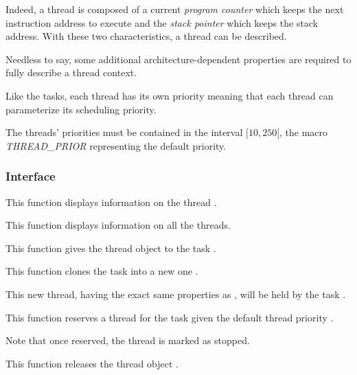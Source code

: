 Indeed, a thread is composed of a current \textit{program counter} which
keeps the next instruction address to execute and the \textit{stack pointer}
which keeps the stack address. With these two characteristics, a thread
can be described.

Needless to say, some additional architecture-dependent properties are
required to fully describe a thread context.

Like the tasks, each thread has its own priority meaning that each thread
can parameterize its scheduling priority.

The threads' priorities must be contained in the interval $[10, 250[$, the
macro \textit{THREAD\_PRIOR} representing the default priority.

%
%

\subsubsection{Interface}

	 {
	   This function displays information on the thread .
	 }

	 {
	   This function displays information on all the threads.
	 }

	 {
	   This function gives the thread object  to the
	   task .
	 }

	 {
	   This function clones the task  into a new one
	   .

	   This new thread, having the exact same properties as ,
	   will be held by the task .
	 }

	 {
	   This function reserves a thread for the task 
	   given the default thread priority .

	   Note that once reserved, the thread is marked as stopped.
	 }

	 {
	   This function releases the thread object .
	 }

